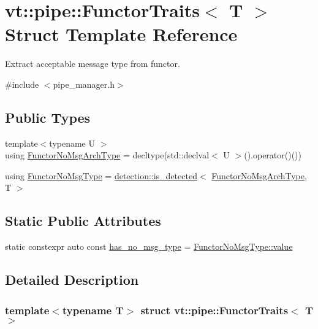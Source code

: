 \hypertarget{structvt_1_1pipe_1_1_functor_traits}{}\section{vt\+:\+:pipe\+:\+:Functor\+Traits$<$ T $>$ Struct Template Reference}
\label{structvt_1_1pipe_1_1_functor_traits}


Extract acceptable message type from functor.  




{\ttfamily \#include $<$pipe\+\_\+manager.\+h$>$}

\subsection*{Public Types}
\begin{DoxyCompactItemize}
\item 
{\footnotesize template$<$typename U $>$ }\\using \hyperlink{structvt_1_1pipe_1_1_functor_traits_af2002cb6723439f6b1e74c7a70255cc8}{Functor\+No\+Msg\+Arch\+Type} = decltype(std\+::declval$<$ U $>$().operator()())
\item 
using \hyperlink{structvt_1_1pipe_1_1_functor_traits_a2b729de8c328206718e4eea1d9b30f9b}{Functor\+No\+Msg\+Type} = \hyperlink{namespacedetection_a30893549a3de1e9603d78dad6d5dce92}{detection\+::is\+\_\+detected}$<$ \hyperlink{structvt_1_1pipe_1_1_functor_traits_af2002cb6723439f6b1e74c7a70255cc8}{Functor\+No\+Msg\+Arch\+Type}, T $>$
\end{DoxyCompactItemize}
\subsection*{Static Public Attributes}
\begin{DoxyCompactItemize}
\item 
static constexpr auto const \hyperlink{structvt_1_1pipe_1_1_functor_traits_aace8b00c70112f7711ce73f1799f7e00}{has\+\_\+no\+\_\+msg\+\_\+type} = \hyperlink{structdetection_1_1detector_a6d7d0e1bdf5903db9edbe448edccf83b}{Functor\+No\+Msg\+Type\+::value}
\end{DoxyCompactItemize}


\subsection{Detailed Description}
\subsubsection*{template$<$typename T$>$\newline
struct vt\+::pipe\+::\+Functor\+Traits$<$ T $>$}

